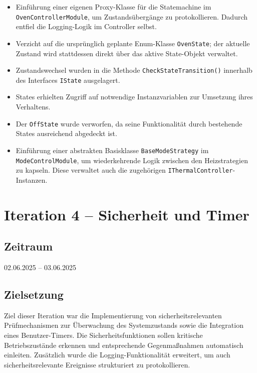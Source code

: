 \documentclass[a4paper,12pt]{article}
\begin{document}
\begin{itemize}
    \item Einführung einer eigenen Proxy-Klasse für die Statemachine im \texttt{OvenControllerModule}, um Zustandsübergänge zu protokollieren. Dadurch entfiel die Logging-Logik im Controller selbst.
    \item Verzicht auf die ursprünglich geplante Enum-Klasse \texttt{OvenState}; der aktuelle Zustand wird stattdessen direkt über das aktive State-Objekt verwaltet.
    \item Zustandswechsel wurden in die Methode \texttt{CheckStateTransition()} innerhalb des Interfaces \texttt{IState} ausgelagert.
    \item States erhielten Zugriff auf notwendige Instanzvariablen zur Umsetzung ihres Verhaltens.
    \item Der \texttt{OffState} wurde verworfen, da seine Funktionalität durch bestehende States ausreichend abgedeckt ist.
    \item Einführung einer abstrakten Basisklasse \texttt{BaseModeStrategy} im \texttt{ModeControlModule}, um wiederkehrende Logik zwischen den Heizstrategien zu kapseln. Diese verwaltet auch die zugehörigen \texttt{IThermalController}-Instanzen.
\end{itemize}

\newpage

\section{Iteration 4 – Sicherheit und Timer}
\label{sec:iteration4}

\subsection{Zeitraum}
02.06.2025 – 03.06.2025

\subsection{Zielsetzung}

Ziel dieser Iteration war die Implementierung von sicherheitsrelevanten Prüfmechanismen zur Überwachung des Systemzustands sowie die Integration eines Benutzer-Timers. Die Sicherheitsfunktionen sollen kritische Betriebszustände erkennen und entsprechende Gegenmaßnahmen automatisch einleiten. Zusätzlich wurde die Logging-Funktionalität erweitert, um auch sicherheitsrelevante Ereignisse strukturiert zu protokollieren.
\end{document}

